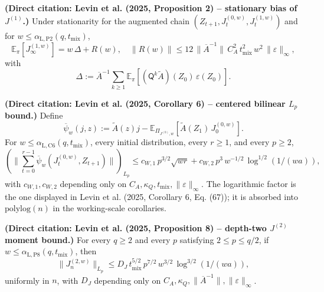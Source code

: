 \begin{lemma}\label{lem:levin-prop-2}
  \textbf{(Direct citation: Levin et al. (2025, Proposition 2) -- stationary bias of
  $J^{(1)}$.)}
  Under stationarity for the augmented chain
  $(Z_{t + 1}, J_{t}^{(0, w)}, J_{t}^{(1, w)})$ and for
  $w \le \alpha_{\mathrm{L,P2}}(q,t_{\mathrm{mix}})$,
  \[
\mathbb{E}_{\pi} [J_{\infty}^{(1, w)}] = w \, \Delta + R(w),
  \quad
  \lVert R(w) \rVert
    \le 12 \, \lVert \overline{A}^{-1} \rVert \, C_{A}^{2} \, t_{\mathrm{mix}}^{2} \, w^{2}
       \, \lVert \varepsilon \rVert_{\infty},
\]
  with
  \[
\Delta := \overline{A}^{-1} \sum_{k \ge 1}
    \mathbb{E}_{\pi} [(\mathsf{Q}^{k} \tilde{A})(Z_{0}) \, \varepsilon(Z_{0})].
\]
\end{lemma}

\begin{lemma}\label{lem:levin-cor-6}
  \textbf{(Direct citation: Levin et al. (2025, Corollary 6) -- centered bilinear
  $L_{p}$ bound.)}
  Define
  \[
\overline{\psi}_{w} (j, z)
    := \tilde{A}(z) j
      - \mathbb{E}_{\Pi_{J^{(0)}, w}} [\tilde{A}(Z_{1}) \, J_{0}^{(0, w)}].
\]
  For $w \le \alpha_{\mathrm{L,C6}}(q,t_{\mathrm{mix}})$, every initial distribution, every
  $r \ge 1$, and every $p \ge 2$,
  \[
\left( \lVert \sum_{t = 0}^{r - 1} \overline{\psi}_{w} (J_{t}^{(0, w)}, Z_{t + 1}) \rVert \right)_{L_{p}}
    \le c_{W, 1} \, p^{3 / 2} \sqrt{w r}
       + c_{W, 2} \, p^{3} \, w^{-1 / 2}
         \, \log^{1 / 2}(1 / (w a)),
\]
  with $c_{W, 1}, c_{W, 2}$ depending only on
  $C_{A}, \kappa_{Q}, t_{\mathrm{mix}}, \lVert \varepsilon \rVert_{\infty}$. The logarithmic factor
  is the one displayed in Levin et al. (2025, Corollary 6, Eq. (67)); it is
  absorbed into $\mathrm{polylog}(n)$ in the working-scale corollaries.
\end{lemma}

\begin{lemma}\label{lem:levin-prop-8}
  \textbf{(Direct citation: Levin et al. (2025, Proposition 8) -- depth-two
  $J^{(2)}$ moment bound.)}
  For every $q \ge 2$ and every $p$ satisfying $2 \le p \le q / 2$, if
  $w \le \alpha_{\mathrm{L,P8}}(q,t_{\mathrm{mix}})$, then
  \[
\lVert J_{n}^{(2, w)} \rVert_{L_{p}}
    \le D_{J} \, t_{\mathrm{mix}}^{5 / 2} \, p^{7 / 2} \, w^{3 / 2}
       \, \log^{3 / 2}(1 / (w a)),
\]
  uniformly in $n$, with $D_{J}$ depending only on
  $C_{A}, \kappa_{Q}, \lVert \overline{A}^{-1} \rVert, \lVert \varepsilon \rVert_{\infty}$.
\end{lemma}

